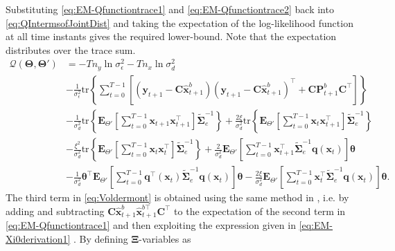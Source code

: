 \documentclass[]{article}
\begin{document}
Substituting  \eqref{eq:EM-Qfunctiontrace1} and \eqref{eq:EM-Qfunctiontrace2} back into \eqref{eq:QIntermsofJointDist} and taking the expectation of the log-likelihood function at all time instants gives the required lower-bound. Note that the expectation distributes over the trace sum. 
\begin{align}\label{eq:Voldermont}
 \mathcal Q(\boldsymbol \Theta,\boldsymbol\Theta')&=-Tn_y\ln \sigma_{\epsilon}^2-Tn_x\ln\sigma_d^2\nonumber \\
& -\frac{1}{\sigma_{\epsilon}^2}\mathrm{tr}\left\lbrace\boldsymbol\sum_{t=0}^{T-1}\left[ (\mathbf y_{t+1}-\mathbf C\mathbf{\hat{x}}_{t+1}^b) (\mathbf y_{t+1}-\mathbf C\mathbf{\hat{x}}_{t+1}^b)^\top+\mathbf C \mathbf P_{t+1}^b\mathbf C^\top\right] \right\rbrace\nonumber \\
&-\frac{1}{\sigma_d^2}\mathrm{tr}\left\lbrace \mathbf E_{\Theta'}\left[\sum_{t=0}^{T-1}\mathbf x_{t+1}\mathbf x_{t+1}^\top\right]\tilde{\boldsymbol\Sigma}_e^{-1}\right\rbrace+\frac{2\xi}{\sigma_d^2} \mathrm{tr}\left\lbrace \mathbf E_{\Theta'}\left[\sum_{t=0}^{T-1}\mathbf x_t\mathbf x_{t+1}^\top\right] \tilde{\boldsymbol\Sigma}_e^{-1}\right\rbrace \nonumber \\
&-\frac{\xi^2}{\sigma_d^2}\mathrm{tr} \left\lbrace\mathbf E_{\Theta'}\left[\sum_{t=0}^{T-1}\mathbf x_t\mathbf x_{t}^\top\right]\tilde{\boldsymbol\Sigma}_e^{-1} \right\rbrace +\frac{2}{\sigma_d^2}\mathbf E_{\Theta'}\left[\sum_{t=0}^{T-1}\mathbf x_{t+1}^\top\tilde{\boldsymbol\Sigma}_e^{-1}\mathbf q( \mathbf x_t)\right]\boldsymbol\theta
 \nonumber \\
&-\frac{1}{\sigma_d^2}\boldsymbol\theta^\top \mathbf E_{\Theta'}\left[\sum_{t=0}^{T-1}  \mathbf q^\top(\mathbf  x_t)\tilde{\boldsymbol\Sigma}_e^{-1}\mathbf q(\mathbf x_t)\right]\boldsymbol\theta-\frac{2\xi}{\sigma_d^2} \mathbf E_{\Theta'}\left[\sum_{t=0}^{T-1} \mathbf x_t^\top\tilde{\boldsymbol\Sigma}_e^{-1}\mathbf q(\mathbf x_t)  \right] \boldsymbol\theta.
\end{align}
The third term in \eqref{eq:Voldermont} is obtained using the same method in \cite{Shumway2000}, i.e. by adding and subtracting $\mathbf C \mathbf{\hat{x}}_{t+1}^b \mathbf{\hat{x}}_{t+1}^{b\top} \mathbf C^\top$ to the expectation of the second term in \eqref{eq:EM-Qfunctiontrace1} and then exploiting the expression given in \eqref{eq:EM-Xi0derivation1} . By defining $\boldsymbol\Xi$-variables as 
\end{document}
